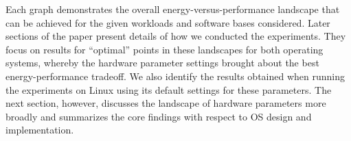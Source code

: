 Each graph demonstrates the overall energy-versus-performance landscape that can be achieved for the given workloads and software bases considered.
Later sections of the paper present  details of how we conducted the experiments.
They focus on results for “optimal” points in these landscapes for both operating systems, whereby the hardware parameter settings brought about the best energy-performance tradeoff.
We also identify the results obtained when running the experiments on Linux using its default settings for these parameters.
The next section, however, discusses the landscape of hardware parameters more broadly and summarizes the core findings with respect to OS design and implementation.


